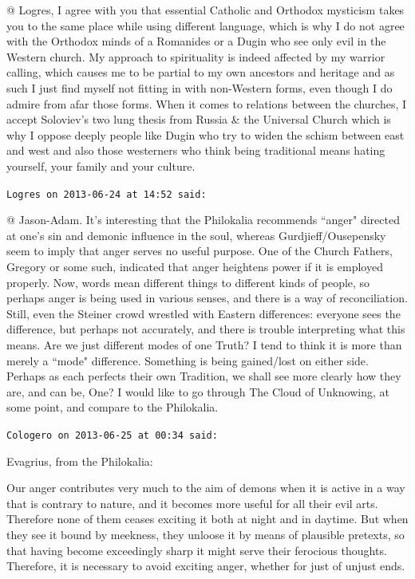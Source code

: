 \begin{footnotesize}
\begin{sffamily}
@ Logres, I agree with you that essential Catholic and Orthodox mysticism takes you to the same place while using different language, which is why I do not agree with the Orthodox minds of a Romanides or a Dugin who see only evil in the Western church. My approach to spirituality is indeed affected by my warrior calling, which causes me to be partial to my own ancestors and heritage and as such I just find myself not fitting in with non-Western forms, even though I do admire from afar those forms. When it comes to relations between the churches, I accept Soloviev's two lung thesis from Russia \& the Universal Church which is why I oppose deeply people like Dugin who try to widen the schism between east and west and also those westerners who think being traditional means hating yourself, your family and your culture.


\hfill

\texttt{Logres on 2013-06-24 at 14:52 said: }

@ Jason-Adam. It's interesting that the Philokalia recommends ``anger" directed at one's sin and demonic influence in the soul, whereas Gurdjieff/Ousepensky seem to imply that anger serves no useful purpose. One of the Church Fathers, Gregory or some such, indicated that anger heightens power if it is employed properly. Now, words mean different things to different kinds of people, so perhaps anger is being used in various senses, and there is a way of reconciliation. Still, even the Steiner crowd wrestled with Eastern differences: everyone sees the difference, but perhaps not accurately, and there is trouble interpreting what this means. Are we just different modes of one Truth? I tend to think it is more than merely a ``mode" difference. Something is being gained/lost on either side. Perhaps as each perfects their own Tradition, we shall see more clearly how they are, and can be, One? I would like to go through The Cloud of Unknowing, at some point, and compare to the Philokalia.


\hfill

\texttt{Cologero on 2013-06-25 at 00:34 said: }

Evagrius, from the Philokalia:

\begin{quotex}
Our anger contributes very much to the aim of demons when it is active in a way that is contrary to nature, and it becomes more useful for all their evil arts. Therefore none of them ceases exciting it both at night and in daytime. But when they see it bound by meekness, they unloose it by means of plausible pretexts, so that having become exceedingly sharp it might serve their ferocious thoughts. Therefore, it is necessary to avoid exciting anger, whether for just of unjust ends. 


\end{quotex}
\end{sffamily}
\end{footnotesize}
